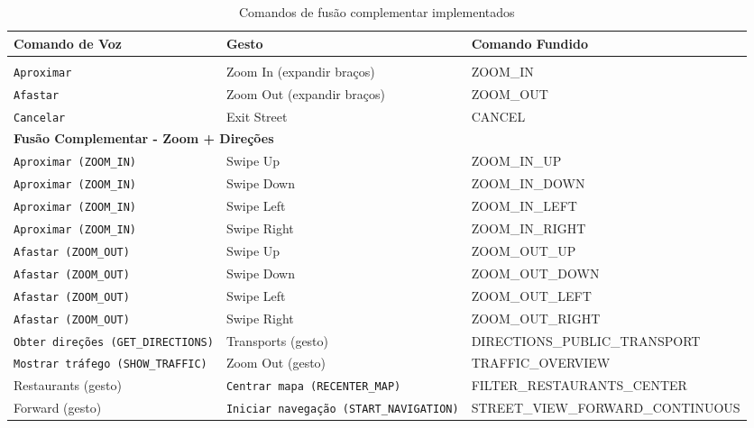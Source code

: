 \documentclass{report}
\begin{document}
\begin{longtable}{p{} p{} p{}}
    \caption{Comandos de fusão complementar implementados} 
    \label{tab:complementary-fusion} \\
    
    \toprule
    \textbf{Comando de Voz} & \textbf{Gesto} & \textbf{Comando Fundido} \\
    \midrule
    \endfirsthead
    \endlastfoot
    
    \multicolumn{3}{l}{\textbf{Redundância}} \\
    \midrule
    \texttt{Aproximar} & Zoom In (expandir braços) & ZOOM\_IN  \\
    \texttt{Afastar} & Zoom Out (expandir braços) & ZOOM\_OUT \\
    \texttt{Cancelar} & Exit Street & CANCEL \\
    \midrule
    
    \multicolumn{3}{l}{\textbf{Fusão Complementar - Zoom + Direções}} \\
    \midrule
    \texttt{Aproximar (ZOOM\_IN)} & Swipe Up & ZOOM\_IN\_UP \\ 
    \texttt{Aproximar (ZOOM\_IN)} & Swipe Down & ZOOM\_IN\_DOWN \\ 
    \texttt{Aproximar (ZOOM\_IN)} & Swipe Left & ZOOM\_IN\_LEFT \\ 
    \texttt{Aproximar (ZOOM\_IN)} & Swipe Right & ZOOM\_IN\_RIGHT \\ 
    \texttt{Afastar (ZOOM\_OUT)} & Swipe Up & ZOOM\_OUT\_UP \\ 
    \texttt{Afastar (ZOOM\_OUT)} & Swipe Down & ZOOM\_OUT\_DOWN \\ 
    \texttt{Afastar (ZOOM\_OUT)} & Swipe Left & ZOOM\_OUT\_LEFT \\ 
    \texttt{Afastar (ZOOM\_OUT)} & Swipe Right & ZOOM\_OUT\_RIGHT \\ 
    \texttt{Obter direções (GET\_DIRECTIONS)} & Transports (gesto) & DIRECTIONS\_PUBLIC\_TRANSPORT \\
    \texttt{Mostrar tráfego (SHOW\_TRAFFIC)} & Zoom Out (gesto) & TRAFFIC\_OVERVIEW \\
    Restaurants (gesto) & \texttt{Centrar mapa (RECENTER\_MAP)} & FILTER\_RESTAURANTS\_CENTER \\
    Forward (gesto) & \texttt{Iniciar navegação (START\_NAVIGATION)} & STREET\_VIEW\_FORWARD\_CONTINUOUS \\
    \bottomrule
\end{longtable}
\end{document}
